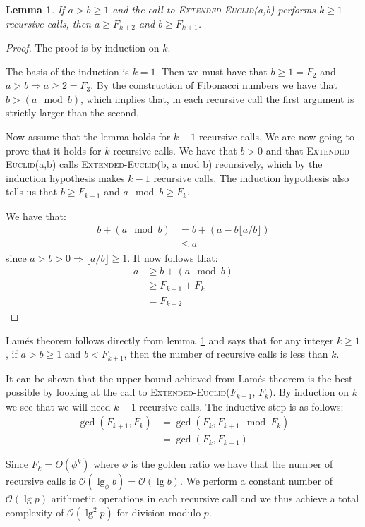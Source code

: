 \documentclass[a4paper,oneside,article,11pt]{memoir}
\newtheorem{lemma}{Lemma}
\begin{document}
\begin{lemma}
\label{lemma:ee-rec}
If $a > b \geq 1$ and the call to \textsc{Extended-Euclid}(a,b) performs $k \geq 1$ recursive calls, then $a \geq F_{k+2}$ and $b \geq F_{k+1}$.
\end{lemma}
\begin{proof}
The proof is by induction on $k$.

The basis of the induction is $k=1$. Then we must have that $b \geq 1 = F_2$ and $a > b \Rightarrow a \geq 2 = F_3$. By the construction of Fibonacci numbers we have that $b > (a \mod b)$, which implies that, in each recursive call the first argument is strictly larger than the second.

Now assume that the lemma holds for $k-1$ recursive calls. We are now going to prove that it holds for $k$ recursive calls. We have that $b > 0$ and that \textsc{Extended-Euclid}(a,b) calls \textsc{Extended-Euclid}(b, a mod b) recursively, which by the induction hypothesis makes $k-1$ recursive calls. The induction hypothesis also tells us that $b \geq F_{k+1}$ and $a \mod b \geq F_k$.

We have that:
\begin{align*}
b+(a\mod b) &= b + (a-b\lfloor a/b \rfloor) \\
&\leq a
\end{align*}
since $a > b > 0 \Rightarrow \lfloor a/b \rfloor \geq 1$. It now follows that:
\begin{align*}
a &\geq b + (a \mod b) \\
&\geq F_{k+1} + F_k \\
&= F_{k+2}
\end{align*}
\end{proof}

Lamés theorem follows directly from lemma~\ref{lemma:ee-rec} and says that for any integer $k\geq 1$, if $a > b \geq 1$ and $b < F_{k+1}$, then the number of recursive calls is less than $k$.

It can be shown that the upper bound achieved from Lamés theorem is the best possible by looking at the call to \textsc{Extended-Euclid}($F_{k+1}$, $F_k$). By induction on $k$ we see that we will need $k-1$ recursive calls.
The inductive step is as follows:
\begin{align*}
\gcd(F_{k+1}, F_k) &= \gcd(F_k, F_{k+1} \mod F_k)\\
&= \gcd(F_k, F_{k-1})
\end{align*}

Since $F_k = \Theta(\phi^k)$ where $\phi$ is the golden ratio we have that the number of recursive calls is $\mathcal{O}(\lg_{\phi} b) = \mathcal{O}(\lg b)$. We perform a constant number of $\mathcal{O}(\lg p)$ arithmetic operations in each recursive call and we thus achieve a total complexity of $\mathcal{O}(\lg^2 p)$ for division modulo $p$.
\end{document}
